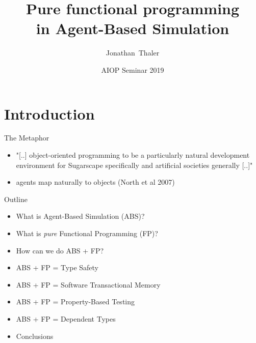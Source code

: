 \documentclass{beamer}
\title[Pure functional programming in Agent-Based Simulation] 
{%
  Pure functional programming \\ in Agent-Based Simulation
}
\author[Thaler]
{
  Jonathan~Thaler
}
\institute[University of Nottingham, Ningbo, China]
{
  University of Nottingham, Ningbo, China
}
\date[AIOP Seminar 2019]
{AIOP Seminar 2019}
\begin{document}
\begin{frame}
  \titlepage
\end{frame}


\section{Introduction}
\begin{frame}{The Metaphor}
\begin{itemize}
  \item "[..] object-oriented programming to be a particularly natural development environment for Sugarscape specifically and artificial societies generally [..]"
  
  \item agents map naturally to objects (North et al 2007)
\end{itemize}
\end{frame}

\begin{frame}{Outline}
\begin{itemize}
  \item What is Agent-Based Simulation (ABS)?
  
  \item What is \textit{pure} Functional Programming (FP)?
  
  \item How can we do ABS + FP?  
  
  \item ABS + FP = Type Safety
  
  \item ABS + FP = Software Transactional Memory 
  
  \item ABS + FP = Property-Based Testing 
  
  \item ABS + FP = Dependent Types
  
  \item Conclusions
\end{itemize}
\end{frame}
\end{document}
